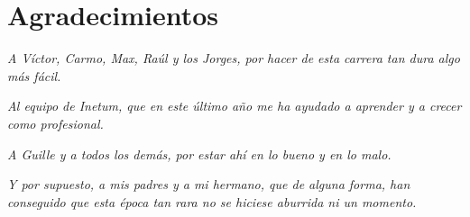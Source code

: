 \chapter*{Agradecimientos} 
\textit{A Víctor, Carmo, Max, Raúl y los Jorges, por hacer de esta carrera tan dura algo más fácil.}


\textit{Al equipo de Inetum, que en este último año me ha ayudado a aprender y a crecer como profesional.}


\textit{A Guille y a todos los demás, por estar ahí en lo bueno y en lo malo.}


\textit{Y por supuesto, a mis padres y a mi hermano, que de alguna forma, han conseguido que esta época tan rara no se hiciese aburrida ni un momento.}


